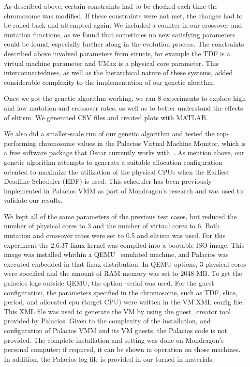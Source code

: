 \documentclass[11pt]{article}
\begin{document}
As described above, certain constraints had to be checked each time the chromosome was modified. If these constraints were not met, the changes had to be rolled back and attempted again. We included a counter in our crossover and mutation functions, as we found that sometimes no new satisfying parameters could be found, especially further along in the evolution process. The constraints described above involved parameters from structs, for example the TDF is a virtual machine parameter and UMax is a physical core parameter. This interconnectedness, as well as the hierarchical nature of these systems, added considerable complexity to the implementation of our genetic alorithm. 

Once we got the genetic algorithm working, we ran 8 experiments to explore high and low mutation and crossover rates, as well as to better understand the effects of elitism. We generated CSV files and created plots with MATLAB. 

We also did a smaller-scale run of our genetic algorithm and tested the top-performing chromosome values in the Palacios Virtual Machine Monitor, which is a free software package that Oscar currently works with~\cite{Mondragon:13}. As mention above, our genetic algorithm attempts to generate a suitable allocation configuration oriented to maximize the utilization of the physical CPUs when the Earliest Deadline Scheduler (EDF) is used. This scheduler has been previously implemented in Palacios VMM as part of Mondragon's research and was used to validate our results.

We kept all of the same parameters of the previous test cases, but reduced the number of physical cores to 3 and the number of virtual cores to 6. Both mutation and crossover rates were set to 0.5 and elitism was used. For this experiment the 2.6.37 linux kernel was compiled into a bootable ISO image. This image was installed whithin a QEMU~\cite{Bellard:2005} emulated machine, and Palacios was executed embedded in that linux distribution. In QEMU options, 3 physical cores were specified and the amount of RAM memory was set to 2048 MB. To get the palacios logs outside QEMU, the option -serial was used. For the guest configuration, the parameters specified in the chromosome, such as TDF, slice, period, and allocated cpu (target CPU) were written in the VM XML config file. This XML file was used to generate the VM by using the guest\_creator tool provided by Palacios. Given to the complexity of the installation, and configuration of Palacios VMM and its VM guests, the Palacios code is not provided. The complete installation and setting was done on Mondragon's personal computer; if required, it can be shown in operation on those machines. In addition, the Palacios log file is provided in our turned in materials.
\end{document}
